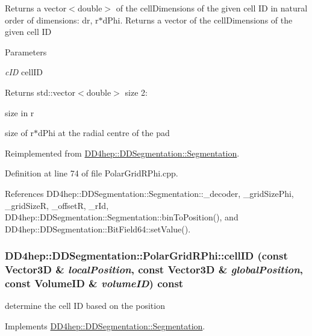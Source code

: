 Returns a vector$<$double$>$ of the cellDimensions of the given cell ID in natural order of dimensions: dr, r$\ast$dPhi. Returns a vector of the cellDimensions of the given cell ID 
\begin{DoxyParams}{Parameters}
\item[{\em cID}]cellID \end{DoxyParams}
\begin{DoxyReturn}{Returns}
std::vector$<$double$>$ size 2:
\begin{DoxyEnumerate}
\item size in r
\item size of r$\ast$dPhi at the radial centre of the pad 
\end{DoxyEnumerate}
\end{DoxyReturn}


Reimplemented from \hyperlink{class_d_d4hep_1_1_d_d_segmentation_1_1_segmentation_a9710f4942d7f6b52ae5342652e17c88d}{DD4hep::DDSegmentation::Segmentation}.

Definition at line 74 of file PolarGridRPhi.cpp.

References DD4hep::DDSegmentation::Segmentation::\_\-decoder, \_\-gridSizePhi, \_\-gridSizeR, \_\-offsetR, \_\-rId, DD4hep::DDSegmentation::Segmentation::binToPosition(), and DD4hep::DDSegmentation::BitField64::setValue().\hypertarget{class_d_d4hep_1_1_d_d_segmentation_1_1_polar_grid_r_phi_adb32acd7b9fda25d500d4f89c5ac0e6c}{
\subsubsection[{cellID}]{ DD4hep::DDSegmentation::PolarGridRPhi::cellID (const {\bf Vector3D} \& {\em localPosition}, \/  const {\bf Vector3D} \& {\em globalPosition}, \/  const {\bf VolumeID} \& {\em volumeID}) const}}
\label{class_d_d4hep_1_1_d_d_segmentation_1_1_polar_grid_r_phi_adb32acd7b9fda25d500d4f89c5ac0e6c}


determine the cell ID based on the position 

Implements \hyperlink{class_d_d4hep_1_1_d_d_segmentation_1_1_segmentation_ad5a60953d96d409850d8192f64f8ce3c}{DD4hep::DDSegmentation::Segmentation}.

